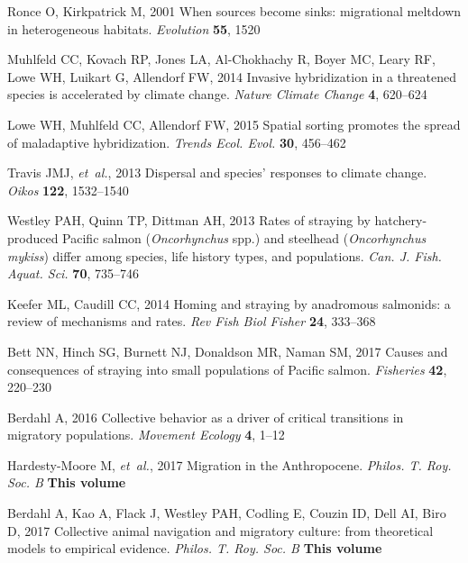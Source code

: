 \documentclass{revtex4}
\begin{document}
\begin{thebibliography}{10}
Ronce O, Kirkpatrick M, 2001 {When sources become sinks: migrational meltdown
  in heterogeneous habitats}.
\newblock \emph{Evolution} \textbf{55}, 1520

Muhlfeld CC, Kovach RP, Jones LA, Al-Chokhachy R, Boyer MC, Leary RF, Lowe WH,
  Luikart G, Allendorf FW, 2014 {Invasive hybridization in a threatened species
  is accelerated by climate change}.
\newblock \emph{Nature Climate Change} \textbf{4}, 620--624

Lowe WH, Muhlfeld CC, Allendorf FW, 2015 {Spatial sorting promotes the spread
  of maladaptive hybridization}.
\newblock \emph{Trends Ecol. Evol.} \textbf{30}, 456--462

Travis JMJ, \emph{et~al.}, 2013 {Dispersal and species{\textquoteright}
  responses to climate change}.
\newblock \emph{Oikos} \textbf{122}, 1532--1540

Westley PAH, Quinn TP, Dittman AH, 2013 {Rates of straying by hatchery-produced
  Pacific salmon (\emph{Oncorhynchus} spp.) and steelhead (\emph{Oncorhynchus
  mykiss}) differ among species, life history types, and populations}.
\newblock \emph{Can. J. Fish. Aquat. Sci.} \textbf{70}, 735--746

Keefer ML, Caudill CC, 2014 {Homing and straying by anadromous salmonids: a
  review of mechanisms and rates}.
\newblock \emph{Rev Fish Biol Fisher} \textbf{24}, 333--368

Bett NN, Hinch SG, Burnett NJ, Donaldson MR, Naman SM, 2017 {Causes and
  consequences of straying into small populations of Pacific salmon}.
\newblock \emph{Fisheries} \textbf{42}, 220--230


Berdahl A, 2016 {Collective behavior as a driver of critical transitions in
  migratory populations}.
\newblock \emph{Movement Ecology} \textbf{4}, 1--12

Hardesty-Moore M, \emph{et~al.}, 2017 {Migration in the Anthropocene}.
\newblock \emph{Philos. T. Roy. Soc. B} \textbf{This volume}

Berdahl A, Kao A, Flack J, Westley PAH, Codling E, Couzin ID, Dell AI, Biro D,
  2017 {Collective animal navigation and migratory culture: from theoretical
  models to empirical evidence.}
\newblock \emph{Philos. T. Roy. Soc. B} \textbf{This volume}


\end{thebibliography}
\end{document}
